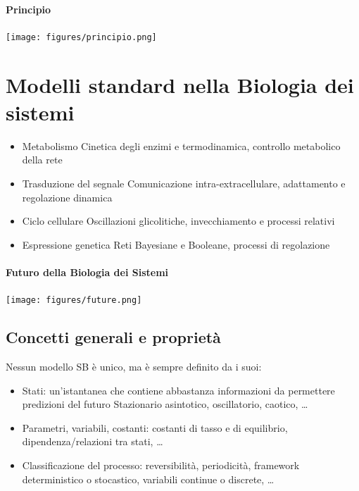 \documentclass{article}
\begin{document}
\paragraph{Principio}
\begin{center}
    \texttt{[image: figures/principio.png]}\\
\end{center}
\section{Modelli standard nella Biologia dei sistemi}
\begin{itemize}
    \item Metabolismo 
    \subitem Cinetica degli enzimi e termodinamica, controllo metabolico della rete
    \item Trasduzione del segnale
    \subitem Comunicazione intra-extracellulare, adattamento e regolazione dinamica
    \item Ciclo cellulare
    \subitem Oscillazioni glicolitiche, invecchiamento e processi relativi
    \item Espressione genetica
    \subitem Reti Bayesiane e Booleane, processi di regolazione
\end{itemize}
\paragraph{Futuro della Biologia dei Sistemi}
\begin{center}
    \texttt{[image: figures/future.png]}\\
\end{center}
\subsection{Concetti generali e proprietà}
Nessun modello SB è unico, ma è sempre definito da i suoi:
\begin{itemize}
    \item Stati:
        \subitem un'istantanea che contiene abbastanza informazioni da permettere predizioni del futuro
        \subitem Stazionario asintotico, oscillatorio, caotico, \dots
    \item Parametri, variabili, costanti:
        \subitem costanti di tasso e di equilibrio, dipendenza/relazioni tra stati, \dots
    \item Classificazione del processo:
        \subitem reversibilità, periodicità, framework deterministico o stocastico, variabili continue o discrete, \dots
\end{itemize}
\end{document}

